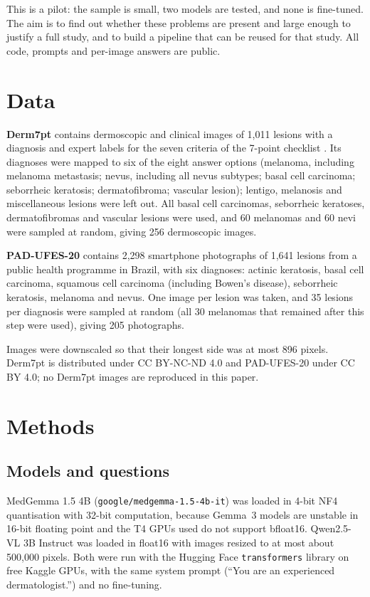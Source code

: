 \documentclass[11pt,a4paper]{article}
\begin{document}
This is a pilot: the sample is small, two models are tested, and none is fine-tuned. The aim is to find out whether these problems are present and large enough to justify a full study, and to build a pipeline that can be reused for that study. All code, prompts and per-image answers are public.

\section{Data}

\textbf{Derm7pt} \cite{kawahara2019} contains dermoscopic and clinical images of 1,011 lesions with a diagnosis and expert labels for the seven criteria of the 7-point checklist \cite{argenziano1998}. Its diagnoses were mapped to six of the eight answer options (melanoma, including melanoma metastasis; nevus, including all nevus subtypes; basal cell carcinoma; seborrheic keratosis; dermatofibroma; vascular lesion); lentigo, melanosis and miscellaneous lesions were left out. All basal cell carcinomas, seborrheic keratoses, dermatofibromas and vascular lesions were used, and 60 melanomas and 60 nevi were sampled at random, giving 256 dermoscopic images.

\textbf{PAD-UFES-20} \cite{pacheco2020} contains 2,298 smartphone photographs of 1,641 lesions from a public health programme in Brazil, with six diagnoses: actinic keratosis, basal cell carcinoma, squamous cell carcinoma (including Bowen's disease), seborrheic keratosis, melanoma and nevus. One image per lesion was taken, and 35 lesions per diagnosis were sampled at random (all 30 melanomas that remained after this step were used), giving 205 photographs.

Images were downscaled so that their longest side was at most 896 pixels. Derm7pt is distributed under CC BY-NC-ND 4.0 and PAD-UFES-20 under CC BY 4.0; no Derm7pt images are reproduced in this paper.

\section{Methods}

\subsection{Models and questions}

MedGemma 1.5 4B (\texttt{google/medgemma-1.5-4b-it}) was loaded in 4-bit NF4 quantisation with 32-bit computation, because Gemma~3 models are unstable in 16-bit floating point and the T4 GPUs used do not support bfloat16. Qwen2.5-VL 3B Instruct was loaded in float16 with images resized to at most about 500,000 pixels. Both were run with the Hugging Face \texttt{transformers} library on free Kaggle GPUs, with the same system prompt (``You are an experienced dermatologist.'') and no fine-tuning.
\end{document}
